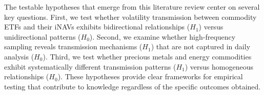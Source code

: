 The testable hypotheses that emerge from this literature review center on several key questions. First, we test whether volatility transmission between commodity ETFs and their iNAVs exhibits bidirectional relationships ($H_1$) versus unidirectional patterns ($H_0$). Second, we examine whether high-frequency sampling reveals transmission mechanisms ($H_1$) that are not captured in daily analysis ($H_0$). Third, we test whether precious metals and energy commodities exhibit systematically different transmission patterns ($H_1$) versus homogeneous relationships ($H_0$). These hypotheses provide clear frameworks for empirical testing that contribute to knowledge regardless of the specific outcomes obtained.